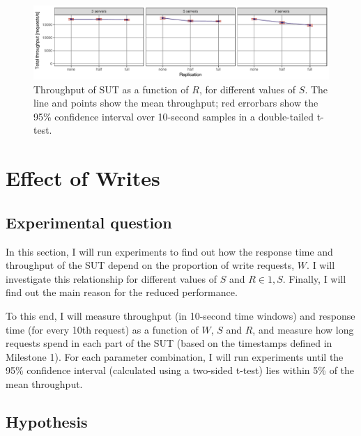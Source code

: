 \documentclass[11pt]{article}
\begin{document}
\begin{figure}[h]
\centering
\includegraphics[width=\textwidth]{../results/replication/graphs/tp_vs_replication_all.pdf}
\caption{Throughput of SUT as a function of $R$, for different values of $S$. The line and points show the mean throughput; red errorbars show the 95\% confidence interval over 10-second samples in a double-tailed t-test.}
\label{fig:exp2:res:throughput}
\end{figure}
 

 \clearpage
\section{Effect of Writes}
\label{sec:exp3}

\subsection{Experimental question}

In this section, I will run experiments to find out how the response time and throughput of the SUT depend on the proportion of write requests, $W$. I will investigate this relationship for different values of $S$ and $R \in {1, S}$. Finally, I will find out the main reason for the reduced performance.

To this end, I will measure throughput (in 10-second time windows) and response time (for every 10th request) as a function of $W$, $S$ and $R$, and measure how long requests spend in each part of the SUT (based on the timestamps defined in Milestone 1). For each parameter combination, I will run experiments until the 95\% confidence interval (calculated using a two-sided t-test) lies within 5\% of the mean throughput.

\subsection{Hypothesis}
\end{document}
